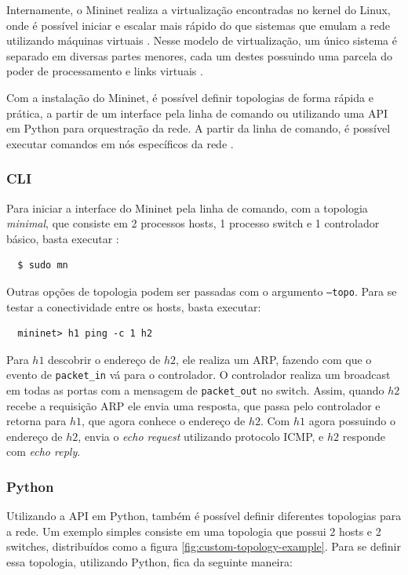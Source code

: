 \documentclass[12pt,
openright, 
oneside,
a4paper,
brazil]{facom-ufu-abntex2}
\theoremstyle{definition}
\begin{document}
Internamente, o Mininet realiza a virtualização encontradas no kernel do Linux, onde é possível
iniciar e escalar mais rápido do que sistemas que emulam a rede utilizando máquinas virtuais
\citep{mininetDocs}. Nesse modelo de virtualização, um único sistema é separado em diversas
partes menores, cada um destes possuindo uma parcela do poder de processamento e links virtuais
\citep{mininetDocs}.

Com a instalação do Mininet, é possível definir topologias de forma rápida e prática, a partir
de um interface pela linha de comando ou utilizando uma API em Python para orquestração da rede.
A partir da linha de comando, é possível executar comandos em nós específicos da rede 
\citep{mininetDocs}. 

\subsubsection{CLI}
Para iniciar a interface do Mininet pela linha de comando, com a topologia
\textit{minimal}, que consiste em 2 processos hosts, 1 processo switch e 1 controlador
básico, basta executar \citep{mininetOrg}:

\begin{verbatim}
  $ sudo mn
\end{verbatim}

Outras opções de topologia podem ser passadas com o argumento \texttt{--topo}. Para se testar a
conectividade entre os hosts, basta executar:

\begin{verbatim}
  mininet> h1 ping -c 1 h2
\end{verbatim}

Para $h1$ descobrir o endereço de $h2$, ele realiza um ARP, fazendo com que o evento de 
\texttt{packet\_in} vá para o controlador. O controlador realiza um broadcast em todas as portas
com a mensagem de \texttt{packet\_out} no switch. Assim, quando $h2$ recebe a requisição ARP ele
envia uma resposta, que passa pelo controlador e retorna para $h1$, que agora conhece o endereço
de $h2$. Com $h1$ agora possuindo o endereço de $h2$, envia o \textit{echo request} utilizando
protocolo ICMP, e $h2$ responde com \textit{echo reply}.

\subsubsection{Python}
Utilizando a API em Python, também é possível definir diferentes topologias para a rede. Um
exemplo simples consiste em uma topologia que possui 2 hosts e 2 switches, distribuídos como
a figura \ref{fig:custom-topology-example}. Para se definir essa topologia, utilizando
Python, fica da seguinte maneira:
\end{document}
